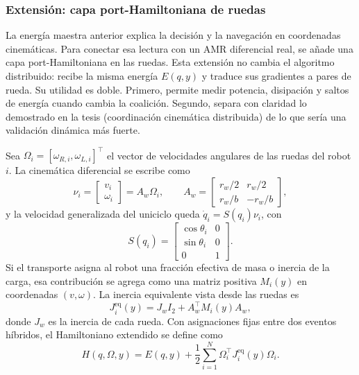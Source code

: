\subsubsection{Extensión: capa port-Hamiltoniana de ruedas}
\label{subsubsec:port_hamiltoniano_ruedas}

La energía maestra anterior explica la decisión y la navegación en coordenadas
cinemáticas. Para conectar esa lectura con un AMR diferencial real, se añade una capa
port-Hamiltoniana en las ruedas. Esta extensión no cambia el algoritmo distribuido:
recibe la misma energía $E(q,y)$ y traduce sus gradientes a pares de rueda. Su utilidad
es doble. Primero, permite medir potencia, disipación y saltos de energía cuando cambia
la coalición. Segundo, separa con claridad lo demostrado en la tesis (coordinación
cinemática distribuida) de lo que sería una validación dinámica más fuerte.

Sea $\Omega_i=[\omega_{R,i},\omega_{L,i}]^\top$ el vector de velocidades angulares de las
ruedas del robot $i$. La cinemática diferencial se escribe como
\begin{equation}
  \nu_i =
  \begin{bmatrix} v_i \\ \omega_i \end{bmatrix}
  =
  A_w\Omega_i,
  \qquad
  A_w =
  \begin{bmatrix}
    r_w/2 & r_w/2\\
    r_w/b & -r_w/b
  \end{bmatrix},
  \label{eq:wheel_map_matrix}
\end{equation}
y la velocidad generalizada del uniciclo queda
$\dot q_i=S(q_i)\nu_i$, con
\[
  S(q_i)=
  \begin{bmatrix}
    \cos\theta_i & 0\\
    \sin\theta_i & 0\\
    0 & 1
  \end{bmatrix}.
\]
Si el transporte asigna al robot una fracción efectiva de masa o inercia de la carga,
esa contribución se agrega como una matriz positiva $M_i(y)$ en coordenadas
$(v,\omega)$. La inercia equivalente vista desde las ruedas es
\begin{equation}
  J_i^{\mathrm{eq}}(y)=J_w I_2 + A_w^\top M_i(y)A_w,
  \label{eq:inercia_equivalente_ruedas}
\end{equation}
donde $J_w$ es la inercia de cada rueda. Con asignaciones fijas entre dos eventos
híbridos, el Hamiltoniano extendido se define como
\begin{equation}
  H(q,\Omega,y)=
  E(q,y)+
  \frac{1}{2}\sum_{i=1}^{N}
  \Omega_i^\top J_i^{\mathrm{eq}}(y)\Omega_i .
  \label{eq:hamiltoniano_ruedas}
\end{equation}

